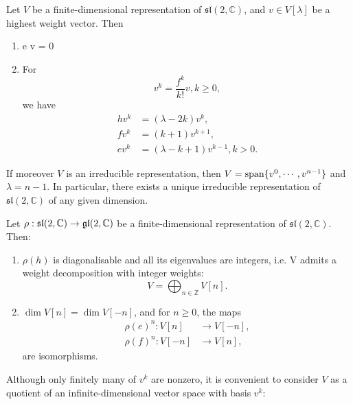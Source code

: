 \documentclass{report}
\begin{document}
\begin{theorem}\label{thm:irreducible_representations_of_sl_2_C}
    Let $V$ be a finite-dimensional representation of $\mathfrak{sl}(2, \mathbb C)$, and $v \in V[\lambda]$ be a highest weight vector. 
    Then
    \begin{enumerate}[label = (\roman*)]
        \item e v = 0
        \item For 
        \[
        v^k = \frac{f^k}{k!} v, k \geq 0,
        \]
        we have
        \begin{align}\label{eq:sl2_highest_weight_relations}
            h v^k &= (\lambda - 2k) v^k,\\
            f v^k &= (k+1) v^{k+1},\\
            e v^k &= (\lambda - k + 1) v^{k-1}, k > 0.           
        \end{align}
    \end{enumerate}
    If moreover $V$ is an irreducible representation, then $V = \operatorname{span}\{v^0, \cdots, v^{n-1}\}$ and $\lambda = n-1$.
    In particular, there exists a unique irreducible representation of $\mathfrak{sl}(2,\mathbb C)$ of any given dimension.
\end{theorem}
\begin{corollary}
    Let $\rho: \mathfrak{sl}(2,\mathbb C) \to \operatorname{{\mathfrak{gl}}}(2,\mathbb C)$ be a finite-dimensional representation of $\mathfrak{sl}(2, \mathbb C)$.
    Then:
    \begin{enumerate}
        \item $\rho(h)$ is diagonalisable and all its eigenvalues are integers, i.e.
        V admits a weight decomposition with integer weights:
        \[
        V = \bigoplus_{n \in \mathbb Z} V[n].
        \]
        \item $\dim V[n] = \dim V[-n]$, and for $n \geq 0$, the maps
        \begin{align*}
            \rho(e)^n: V[n] &\rightarrow V[-n],\\
            \rho(f)^n: V[-n] &\rightarrow V[n],
        \end{align*}
        are isomorphisms.
    \end{enumerate}
\end{corollary}
Although only finitely many of $v^k$ are nonzero, it is convenient to consider $V$ as a quotient of an infinite-dimensional vector space with basis $v^k$:
\end{document}
